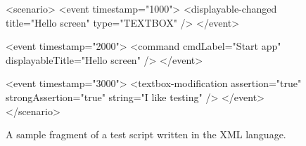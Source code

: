 \begin{figure}[t]
\begin{codeblock}
<scenario>
  <event timestamp="1000">
      <displayable-changed title="Hello screen" type="TEXTBOX" />
  </event>
    
  <event timestamp="2000">
      <command cmdLabel="Start app" displayableTitle="Hello screen" />
  </event>
    
  <event timestamp="3000">        
      <textbox-modification assertion="true" strongAssertion="true" string="I like testing" />
  </event>
</scenario>
\end{codeblock}
\caption{A sample fragment of a test script written in the XML language.}\label{fig:xmllanguage}
\end{figure}

